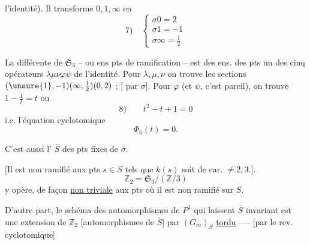 
l'identité). Il transforme $0,1,\infty$ en
\[
7)\quad\left\{\begin{array}{l}\sigma0=2\\\sigma1=-1\\\sigma\infty=\tfrac12\end{array}\right.
\]

La différente de $\mathfrak S_3$ -- ou ens pts de ramification -- est  des ens. des pts  un des cinq opérateurs $\lambda\mu\nu\varphi\psi$  de l'identité. Pour $\lambda,\mu,\nu$ on trouve les sections $(\unsure{1},-1)(\infty,\tfrac12)(0,2)$ ; [ par $\sigma$]. Pour $\varphi$ (et $\psi$, c'est pareil), on trouve $1-\frac1t=t$ ou
\[
8)\qquad t^2-t+1=0
\]
i.e. l'équation cyclotomique
\[
\boxed{\Phi_6(t)=0}.
\]


C'est aussi l' $\overline S$ des pts fixes de $\sigma$.

[Il est non ramifié  aux pts $s\in S$ tels que $k(s)$ soit de car. $\ne2,3$.].
\[
\mathbb Z_2=\mathfrak S_3/(\mathbb Z/3)
\]
y opère, de façon \uline{non triviale} aux pts où il est non ramifié sur $S$.

D'autre part, le schéma  des automorphismes de $P^1$ qui laissent $\overline S$  invariant est une extension de $\mathbb Z_2$ [automorphismes de $\overline S$] par $(G_m)_S$ \uline{tordu} ---- [par le rev. cyclotomique]
